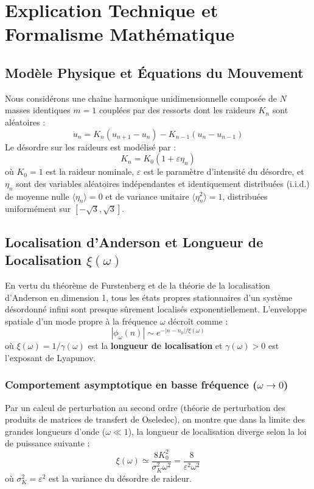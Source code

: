 \documentclass[11pt,a4paper]{article}
\begin{document}
\newpage
\section{Explication Technique et Formalisme Mathématique}

\subsection{Modèle Physique et Équations du Mouvement}
Nous considérons une chaîne harmonique unidimensionnelle composée de $N$ masses identiques $m=1$ couplées par des ressorts dont les raideurs $K_n$ sont aléatoires :
\begin{equation}
    \ddot{u}_n = K_n (u_{n+1} - u_n) - K_{n-1} (u_n - u_{n-1})
\end{equation}
Le désordre sur les raideurs est modélisé par :
\begin{equation}
    K_n = K_0 (1 + \varepsilon \eta_n)
\end{equation}
où $K_0 = 1$ est la raideur nominale, $\varepsilon$ est le paramètre d'intensité du désordre, et $\eta_n$ sont des variables aléatoires indépendantes et identiquement distribuées (i.i.d.) de moyenne nulle $\langle \eta_n \rangle = 0$ et de variance unitaire $\langle \eta_n^2 \rangle = 1$, distribuées uniformément sur $[-\sqrt{3}, \sqrt{3}]$.

\subsection{Localisation d'Anderson et Longueur de Localisation $\xi(\omega)$}
En vertu du théorème de Furstenberg et de la théorie de la localisation d'Anderson en dimension 1, tous les états propres stationnaires d'un système désordonné infini sont presque sûrement localisés exponentiellement. L'enveloppe spatiale d'un mode propre à la fréquence $\omega$ décroît comme :
\begin{equation}
    |\phi_\omega(n)| \sim e^{-|n - n_0|/\xi(\omega)}
\end{equation}
où $\xi(\omega) = 1/\gamma(\omega)$ est la \textbf{longueur de localisation} et $\gamma(\omega) > 0$ est l'exposant de Lyapunov.

\subsubsection{Comportement asymptotique en basse fréquence ($\omega \to 0$)}
Par un calcul de perturbation au second ordre (théorie de perturbation des produits de matrices de transfert de Oseledec), on montre que dans la limite des grandes longueurs d'onde ($\omega \ll 1$), la longueur de localisation diverge selon la loi de puissance suivante :
\begin{equation}
    \xi(\omega) \simeq \frac{8 K_0^2}{\sigma_K^2 \omega^2} = \frac{8}{\varepsilon^2 \omega^2}
    \label{eq:scaling_low_freq}
\end{equation}
où $\sigma_K^2 = \varepsilon^2$ est la variance du désordre de raideur. 
\end{document}
